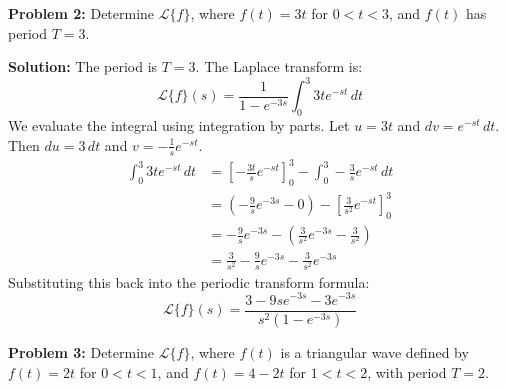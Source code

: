 \documentclass[11pt, letterpaper]{article}
\theoremstyle{definition}
\theoremstyle{remark}
\begin{document}
\begin{center}
\end{center}

\vspace{1em}
\textbf{Problem 2:} Determine $\mathcal{L}\{f\}$, where $f(t) = 3t$ for $0 < t < 3$, and $f(t)$ has period $T = 3$.

\textbf{Solution:}
The period is $T = 3$. The Laplace transform is:
\[ \mathcal{L}\{f\}(s) = \frac{1}{1 - e^{-3s}} \int_0^3 3t e^{-st} \,dt \]
We evaluate the integral using integration by parts. Let $u = 3t$ and $dv = e^{-st} \,dt$. Then $du = 3 \,dt$ and $v = -\frac{1}{s}e^{-st}$.
\begin{align*}
\int_0^3 3t e^{-st} \,dt &= \left[ -\frac{3t}{s} e^{-st} \right]_0^3 - \int_0^3 -\frac{3}{s} e^{-st} \,dt \\
&= \left( -\frac{9}{s} e^{-3s} - 0 \right) - \left[ \frac{3}{s^2} e^{-st} \right]_0^3 \\
&= -\frac{9}{s} e^{-3s} - \left( \frac{3}{s^2} e^{-3s} - \frac{3}{s^2} \right) \\
&= \frac{3}{s^2} - \frac{9}{s} e^{-3s} - \frac{3}{s^2} e^{-3s}
\end{align*}
Substituting this back into the periodic transform formula:
\[ \mathcal{L}\{f\}(s) = \frac{3 - 9s e^{-3s} - 3 e^{-3s}}{s^2(1 - e^{-3s})} \]

\vspace{1em}
\textbf{Problem 3:} Determine $\mathcal{L}\{f\}$, where $f(t)$ is a triangular wave defined by $f(t) = 2t$ for $0 < t < 1$, and $f(t) = 4 - 2t$ for $1 < t < 2$, with period $T = 2$.
\end{document}
